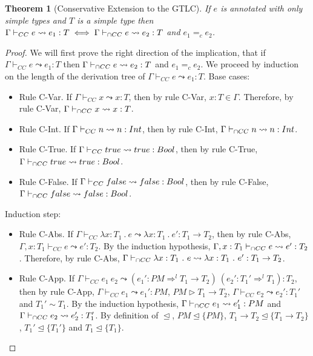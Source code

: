 \documentclass[a4paper]{article}
\newtheorem{theorem}{Theorem}[section]
\begin{document}
\begin{theorem}[Conservative Extension to the GTLC]
\label{conservative_extension_intersection_cast_insertion}
If $e$ is annotated with only simple types and $T$ is a simple type then $\Gamma \vdash_{CC} e \leadsto e_1 : T \iff \Gamma \vdash_{\cap CC} e \leadsto e_2 : T$ and $e_1 =_{c} e_2$.
\end{theorem}
\begin{proof}
We will first prove the right direction of the implication, that if $\Gamma \vdash_{CC} e \leadsto e_1 : T$ then $\Gamma \vdash_{\cap CC} e \leadsto e_2 : T$ and $e_1 =_{c} e_2$.
We proceed by induction on the length of the derivation tree of $\Gamma \vdash_{CC} e \leadsto e_1 : T$.
Base cases:
\begin{itemize}
    \item Rule C-Var.
    If $\Gamma \vdash_{CC} x \leadsto x : T$, then by rule C-Var, $x : T \in \Gamma$.
    Therefore, by rule C-Var, $\Gamma \vdash_{\cap CC} x \leadsto x : T$.
    \item Rule C-Int.
    If $\Gamma \vdash_{CC} n \leadsto n : {Int}$, then by rule C-Int, $\Gamma \vdash_{\cap CC} n \leadsto n : {Int}$.
    \item Rule C-True.
    If $\Gamma \vdash_{CC} true \leadsto true : Bool$, then by rule C-True, $\Gamma \vdash_{\cap CC} true \leadsto true : Bool$.
    \item Rule C-False.
    If $\Gamma \vdash_{CC} false \leadsto false : Bool$, then by rule C-False, $\Gamma \vdash_{\cap CC} false \leadsto false : Bool$.
\end{itemize}
Induction step:
\begin{itemize}
    \item Rule C-Abs.
    If $\Gamma \vdash_{CC} \lambda x : T_1\ .\ e \leadsto \lambda x : T_1\ .\ e' : T_1 \rightarrow T_2$, then by rule C-Abs, $\Gamma, x : T_1 \vdash_{CC} e \leadsto e' : T_2$.
    By the induction hypothesis, $\Gamma, x : T_1 \vdash_{\cap CC} e \leadsto e' : T_2$.
    Therefore, by rule C-Abs, $\Gamma \vdash_{\cap CC} \lambda x : T_1\ .\ e \leadsto \lambda x : T_1\ .\ e' : T_1 \rightarrow T_2$.
    \item Rule C-App.
    If $\Gamma \vdash_{CC} e_1\ e_2 \leadsto (e_1' : PM \Rightarrow^l T_1 \rightarrow T_2)\ (e_2' : T_1' \Rightarrow^l T_1) : T_2$, then by rule C-App, $\Gamma \vdash_{CC} e_1 \leadsto e_1' : PM$, $PM \rhd T_1 \rightarrow T_2$, $\Gamma \vdash_{CC} e_2 \leadsto e_2' : T_1'$ and $T_1' \sim T_1$.
    By the induction hypothesis, $\Gamma \vdash_{\cap CC} e_1 \leadsto e_1' : PM$ and $\Gamma \vdash_{\cap CC} e_2 \leadsto e_2' : T_1'$.
    By definition of $\trianglelefteq$, $PM \trianglelefteq \{PM\}$, $T_1 \rightarrow T_2 \trianglelefteq \{T_1 \rightarrow T_2\}$, $T_1' \trianglelefteq \{T_1'\}$ and $T_1 \trianglelefteq \{T_1\}$.

\end{itemize}
\end{proof}
\end{document}
